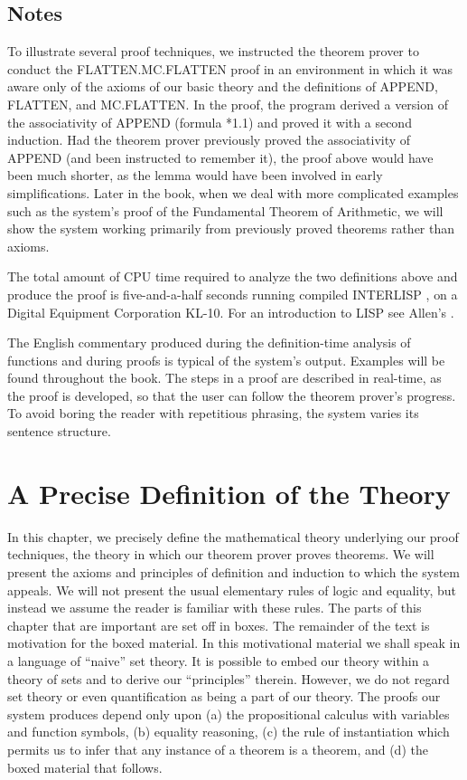 \documentclass[10pt]{book}
\begin{document}
\section{Notes}
To illustrate several proof techniques, we instructed the
theorem prover to conduct the FLATTEN.MC.FLATTEN proof
in an environment in which it was aware only of the
axioms of our basic theory and the definitions of APPEND,
FLATTEN, and MC.FLATTEN.
In the proof, the program derived a version of
the associativity of APPEND (formula *1.1) and proved it with a
second induction.  Had the theorem prover
previously proved the associativity of APPEND (and been instructed to
remember it), the proof above would have been much shorter, as the
lemma would have been involved in early simplifications.  Later in the book,
when we deal with more complicated examples such as the system's
proof of the Fundamental Theorem of Arithmetic, we will show the
system working primarily from previously proved theorems rather than
axioms.

The total amount of
CPU time required to analyze the two definitions above and produce
the proof is five-and-a-half seconds running compiled INTERLISP
\cite{TEITELMAN}, \cite{VM} on a Digital Equipment Corporation KL-10.  For an
introduction to LISP see Allen's \cite{JOHNALLEN}.

The English commentary produced during the definition-time analysis of
functions and during proofs is typical of the system's
output.  Examples will be found throughout the book.
The steps in a proof are described in real-time,
as the proof is developed, so that the user can follow the theorem prover's
progress.  To avoid boring the reader with repetitious phrasing, the system
varies its sentence structure.

\chapter{A Precise Definition of the Theory}
\pagestyle{headings}
\label{SECTHEFORMALTHEORY}
In this chapter, we precisely
define the mathematical theory underlying our proof
techniques, the theory in which our theorem prover
proves theorems.  We will present the axioms and 
principles of definition and induction to which
the system appeals.  We will not present
the usual elementary rules of logic and equality,
but instead we assume the reader is familiar with
these rules.  The parts of this chapter that are
important are set off in boxes.
The remainder of the text is motivation
for the boxed material.  In this motivational
material we shall speak in a language of ``naive''
set theory.  It is  possible to embed
our theory within a theory of sets and to
derive our ``principles'' therein.  However, we  do not regard
set theory or even quantification as being a part
of our theory.  The proofs our system produces depend only upon (a)
the propositional calculus with variables and function symbols,
(b) equality reasoning, (c) the rule of instantiation which
permits us to infer that any instance of a theorem is a theorem,
and (d) the boxed material that follows.
\end{document}
